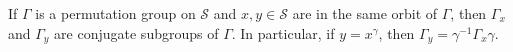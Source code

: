 If $\Gamma$ is a permutation group on $\mathcal{S}$ and $x, y \in \mathcal{S}$ are in the same orbit of $\Gamma$, then $\Gamma_x$ and $\Gamma_y$ are conjugate subgroups of $\Gamma$. In particular, if $y = x^\gamma$, then $\Gamma_y = \gamma^{-1} \Gamma_x \gamma$.
